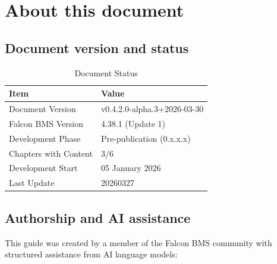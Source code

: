 \documentclass[11pt, a4paper, twoside]{report}
\newcommand{\docversion}{v0.4.2.0-alpha.3}
\newcommand{\docbuild}{2026-03-30}
\newcommand{\docstartdate}{05 January 2026}
\newcommand{\docenddate}{20260327}
\newcommand{\chapterscompletedof}{3/6}
\newcommand{\fulldocversion}{\docversion+\docbuild}
\begin{document}
\section{About this document}
\label{sec:C1-S4}

\subsection{Document version and status}
\label{sec:C1-S4-S1}

\begin{table}[H]
	\centering
	\caption{Document Status}
	\label{tab:C1-doc-status}
	\small
	\renewcommand{\arraystretch}{1.25}
	\begin{tabular}{L{4.5cm} L{9.0cm}}
		\toprule
		\textbf{Item} & \textbf{Value} \\
		\midrule
		Document Version & \fulldocversion \\
		Falcon BMS Version & 4.38.1 (Update 1) \\
		Development Phase & Pre-publication (0.x.x.x) \\
		Chapters with Content & \chapterscompletedof \\
		Development Start & \docstartdate \\
		Last Update & \docenddate \\
		\bottomrule
	\end{tabular}
\end{table}

\subsection{Authorship and AI assistance}
\label{sec:C1-S4-S2}

This guide was created by a member of the Falcon BMS community with structured assistance from AI language models:
\end{document}
